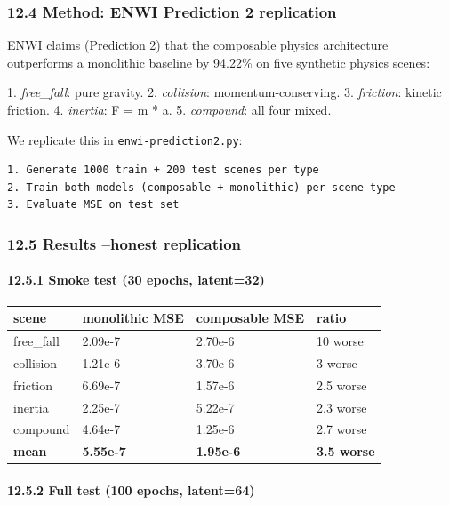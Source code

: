 \documentclass[11pt]{article}
\begin{document}
\subsubsection{12.4 Method: ENWI Prediction 2 replication}

ENWI claims (Prediction 2) that the composable physics architecture outperforms
a monolithic baseline by 94.22\% on five synthetic physics scenes:

1. \textit{free\_fall}: pure gravity.
2. \textit{collision}: momentum-conserving.
3. \textit{friction}: kinetic friction.
4. \textit{inertia}: F = m * a.
5. \textit{compound}: all four mixed.

We replicate this in \texttt{enwi-prediction2.py}:

\begin{verbatim}
1. Generate 1000 train + 200 test scenes per type
2. Train both models (composable + monolithic) per scene type
3. Evaluate MSE on test set
\end{verbatim}

\subsubsection{12.5 Results --honest replication}

\paragraph{12.5.1 Smoke test (30 epochs, latent=32)}

\begin{tabular}{llll}
scene & monolithic MSE & composable MSE & ratio \\
\hline
free\_fall & 2.09e-7 & 2.70e-6 & 10 worse \\
collision & 1.21e-6 & 3.70e-6 & 3 worse \\
friction & 6.69e-7 & 1.57e-6 & 2.5 worse \\
inertia & 2.25e-7 & 5.22e-7 & 2.3 worse \\
compound & 4.64e-7 & 1.25e-6 & 2.7 worse \\
\textbf{mean} & \textbf{5.55e-7} & \textbf{1.95e-6} & \textbf{3.5 worse} \\
\end{tabular}


\paragraph{12.5.2 Full test (100 epochs, latent=64)}
\end{document}
